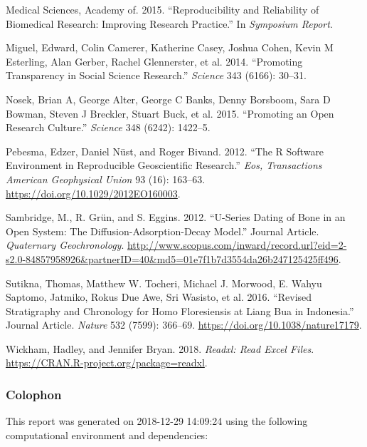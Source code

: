 \documentclass[]{elsarticle} %
\begin{document}
\leavevmode\hypertarget{ref-academy2015reproducibility}{}%
Medical Sciences, Academy of. 2015. ``Reproducibility and Reliability of Biomedical Research: Improving Research Practice.'' In \emph{Symposium Report}.

\leavevmode\hypertarget{ref-miguel2014promoting}{}%
Miguel, Edward, Colin Camerer, Katherine Casey, Joshua Cohen, Kevin M Esterling, Alan Gerber, Rachel Glennerster, et al. 2014. ``Promoting Transparency in Social Science Research.'' \emph{Science} 343 (6166): 30--31.

\leavevmode\hypertarget{ref-nosek2015promoting}{}%
Nosek, Brian A, George Alter, George C Banks, Denny Borsboom, Sara D Bowman, Steven J Breckler, Stuart Buck, et al. 2015. ``Promoting an Open Research Culture.'' \emph{Science} 348 (6242): 1422--5.

\leavevmode\hypertarget{ref-Pebesma_Nust_Bivand_2012}{}%
Pebesma, Edzer, Daniel Nüst, and Roger Bivand. 2012. ``The R Software Environment in Reproducible Geoscientific Research.'' \emph{Eos, Transactions American Geophysical Union} 93 (16): 163--63. \url{https://doi.org/10.1029/2012EO160003}.

\leavevmode\hypertarget{ref-Sambridge2012}{}%
Sambridge, M., R. Grün, and S. Eggins. 2012. ``U-Series Dating of Bone in an Open System: The Diffusion-Adsorption-Decay Model.'' Journal Article. \emph{Quaternary Geochronology}. \url{http://www.scopus.com/inward/record.url?eid=2-s2.0-84857958926\&partnerID=40\&md5=01e7f1b7d3554da26b247125425ff496}.

\leavevmode\hypertarget{ref-Sutikna2016}{}%
Sutikna, Thomas, Matthew W. Tocheri, Michael J. Morwood, E. Wahyu Saptomo, Jatmiko, Rokus Due Awe, Sri Wasisto, et al. 2016. ``Revised Stratigraphy and Chronology for Homo Floresiensis at Liang Bua in Indonesia.'' Journal Article. \emph{Nature} 532 (7599): 366--69. \url{https://doi.org/10.1038/nature17179}.

\leavevmode\hypertarget{ref-Wickham_readxl}{}%
Wickham, Hadley, and Jennifer Bryan. 2018. \emph{Readxl: Read Excel Files}. \url{https://CRAN.R-project.org/package=readxl}.

\newpage

\hypertarget{colophon}{%
\subsubsection{Colophon}\label{colophon}}

This report was generated on 2018-12-29 14:09:24 using the following computational environment and dependencies:
\end{document}
